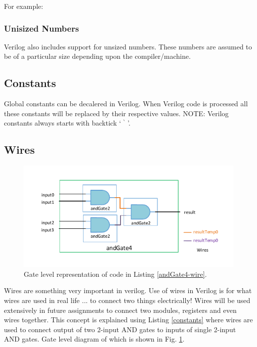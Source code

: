 \documentclass[a4paper,10pt]{article}
\theoremstyle{mytheor}
\newcommand{
  \insertverilog}[3]{
  
}
\begin{document}
For example:
\insertverilog{./verilog_files/sizedNumbers.v}{sized-numbers}{\text{Example of sized numbers}}
 
\subsubsection*{Unisized Numbers}
Verilog also includes support for unsized numbers. These numbers are
assumed to be of a particular size depending upon the
compiler/machine.

\subsection*{Constants}
Global constants can be decalered in Verilog. When Verilog code is processed all these constants will be replaced by their respective values. NOTE: Verilog constants always starts with backtick ` ${}^{\backprime}$ '. 
\insertverilog{./verilog_files/constants.v}{constants}{\text{Declaration and use of constants}}

\subsection*{Wires}

\begin{figure}[!h] \centering  
  \includegraphics[width=\linewidth]{./resources/andGate4_representation.pdf}
  \caption{Gate level representation of code in Listing \ref{andGate4-wire}.} 
  \label{Fig:andGate4-representation}
\end{figure}

Wires are something very important in verilog. Use of wires in Verilog is for what wires are used in real life ... to connect two things electrically! Wires will be used extensively in future assignments to connect two modules, registers and even wires together. This concept is explained using Listing \ref{constants} where wires are used to connect output of two 2-input AND gates to inputs of single 2-input AND gates. Gate level diagram of which is shown in Fig. \ref{Fig:andGate4-representation}.
\end{document}
